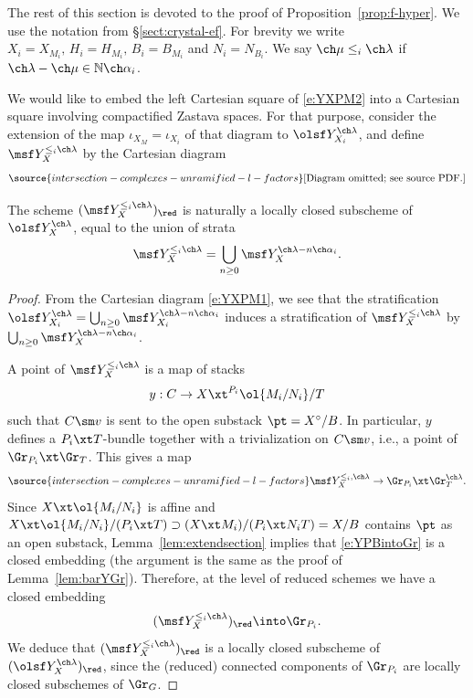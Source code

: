 \subsubsection{} The rest of this section is devoted to the proof of Proposition~\ref{prop:f-hyper}.
We use the notation from \S\ref{sect:crystal-ef}.
For brevity we write $X_i = X_{M_i},\, H_i=H_{M_i},\, B_i = B_{M_i}$ and
$N_i=N_{B_i}$.
We say $\ch\mu \le_i \ch\lambda$ if $\ch\lambda-\ch\mu \in \mathbb N\ch\alpha_i$.


We would like to embed the left Cartesian square of \eqref{e:YXPM2} into a Cartesian square involving compactified Zastava spaces. For that purpose, consider the extension of the map $\iota_{X_M} = \iota_{X_i}$ of that diagram to $\olsf Y^{\ch\lambda}_{X_i}$, and define $\msf Y^{\le_i \ch\lambda}_{X}$ by the Cartesian diagram
\begin{equation} \label{e:YXPM3}
\source{intersection-complexes-unramified-l-factors}
\text{[Diagram omitted; see source PDF.]}
\end{equation}


\begin{lem}
\notready
\label{lem:CartXi}
The scheme $(\msf Y^{\le_i \ch\lambda}_{X})_\red$ is naturally a locally closed subscheme of $\olsf Y^{\ch\lambda}_X$, equal to the union of strata
\[
\msf Y^{\le_i \ch\lambda}_{X} = \bigcup_{n\ge 0} \msf Y^{\ch\lambda- n\ch\alpha_i}_X.
\]
\end{lem}

\begin{proof}
From the Cartesian diagram \eqref{e:YXPM1}, we see that
the stratification
$\olsf Y^{\ch\lambda}_{X_i} = \bigcup_{n\ge 0} \msf Y^{\ch\lambda-n\ch\alpha_i}_{X_i}$
induces a stratification
of $\msf Y^{\le_i \ch\lambda}_{X}$ by
$\bigcup_{n\ge 0}\msf Y^{\ch\lambda-n\ch\alpha_i}_X$.

A point of $\msf Y^{\le_i\ch\lambda}_{X}$ is a map of stacks
\[
    y: C \to X \xt^{P_i} \ol{M_i/N_i} / T
\]
such that $C\sm v$ is sent to the open substack $\pt = X^\circ/B$.
In particular, $y$ defines a $P_i \xt T$-bundle together with a trivialization on $C\sm v$, i.e.,
a point of $\Gr_{P_i} \xt \Gr_T$.
This gives a map
\begin{equation} \label{e:YPBintoGr}
\source{intersection-complexes-unramified-l-factors}
    \msf Y^{\le_i,\ch\lambda}_{X} \to \Gr_{P_i} \xt \Gr_T^{\ch\lambda}.
\end{equation}
Since $X \xt \ol{M_i/N_i}$ is affine and $X \xt \ol{M_i/N_i} / (P_i \xt T) \supset
(X \xt M_i)/ (P_i\xt N_i T) = X/B$
contains $\pt$ as an open substack, Lemma~\ref{lem:extendsection}
implies that \eqref{e:YPBintoGr} is a closed embedding (the argument is
the same as the proof of Lemma~\ref{lem:barYGr}).
Therefore, at the level of reduced schemes we have
a closed embedding
\[ (\msf Y^{\le_i\ch\lambda}_{X})_\red \into \Gr_{P_i}. \]
We deduce that $(\msf Y^{\le_i \ch\lambda}_{X})_\red$ is a locally closed
subscheme of $(\olsf Y^{\ch\lambda}_X)_\red$, since the (reduced) connected components of
$\Gr_{P_i}$ are locally closed subschemes of $\Gr_G$.
\end{proof}

